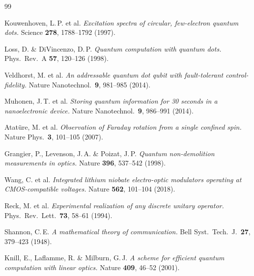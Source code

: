 \begin{thebibliography}{99}

Kouwenhoven, L.\,P. et al.
\textit{Excitation spectra of circular, few-electron quantum dots.}
Science \textbf{278}, 1788--1792 (1997).

Loss, D. \& DiVincenzo, D.\,P.
\textit{Quantum computation with quantum dots.}
Phys.\ Rev.\ A \textbf{57}, 120--126 (1998).

Veldhorst, M. et al.
\textit{An addressable quantum dot qubit with fault-tolerant control-fidelity.}
Nature Nanotechnol.\ \textbf{9}, 981--985 (2014).

Muhonen, J.\,T. et al.
\textit{Storing quantum information for 30 seconds in a nanoelectronic device.}
Nature Nanotechnol.\ \textbf{9}, 986--991 (2014).

Atatüre, M. et al.
\textit{Observation of Faraday rotation from a single confined spin.}
Nature Phys.\ \textbf{3}, 101--105 (2007).

Grangier, P., Levenson, J.\,A. \& Poizat, J.\,P.
\textit{Quantum non-demolition measurements in optics.}
Nature \textbf{396}, 537--542 (1998).

Wang, C. et al.
\textit{Integrated lithium niobate electro-optic modulators operating at
CMOS-compatible voltages.}
Nature \textbf{562}, 101--104 (2018).

Reck, M. et al.
\textit{Experimental realization of any discrete unitary operator.}
Phys.\ Rev.\ Lett.\ \textbf{73}, 58--61 (1994).

Shannon, C.\,E.
\textit{A mathematical theory of communication.}
Bell Syst.\ Tech.\ J.\ \textbf{27}, 379--423 (1948).

Knill, E., Laflamme, R. \& Milburn, G.\,J.
\textit{A scheme for efficient quantum computation with linear optics.}
Nature \textbf{409}, 46--52 (2001).

\end{thebibliography}
